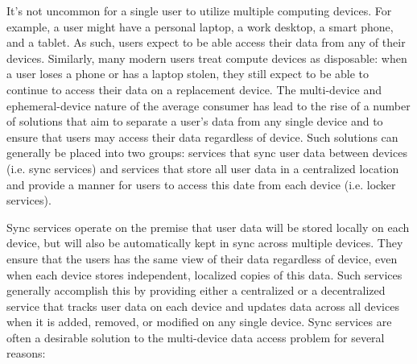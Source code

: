 It's not uncommon for a single user to utilize multiple computing
devices. For example, a user might have a personal laptop, a work
desktop, a smart phone, and a tablet. As such, users expect to be able
access their data from any of their devices. Similarly, many modern
users treat compute devices as disposable: when a user loses a phone
or has a laptop stolen, they still expect to be able to continue to
access their data on a replacement device. The multi-device and
ephemeral-device nature of the average consumer has lead to the rise
of a number of solutions that aim to separate a user's data from any
single device and to ensure that users may access their data
regardless of device. Such solutions can generally be placed into two
groups: services that sync user data between devices (i.e. sync
services) and services that store all user data in a centralized
location and provide a manner for users to access this date from each
device (i.e. locker services).

Sync services operate on the premise that user data will be stored
locally on each device, but will also be automatically kept in sync
across multiple devices. They ensure that the users has the same view
of their data regardless of device, even when each device stores
independent, localized copies of this data. Such services generally
accomplish this by providing either a centralized or a decentralized
service that tracks user data on each device and updates data across
all devices when it is added, removed, or modified on any single
device. Sync services are often a desirable solution to the
multi-device data access problem for several reasons:

